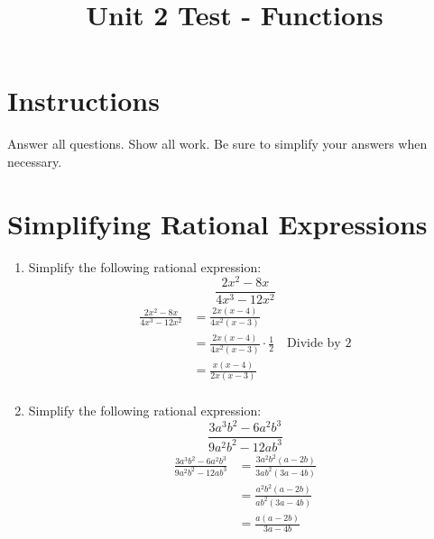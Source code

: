 \documentclass{article}
\title{Unit 2 Test - Functions}
\date{}
\begin{document}
\maketitle

\section*{Instructions}
Answer all questions. Show all work. Be sure to simplify your answers when necessary.

\section*{Simplifying Rational Expressions}
\begin{enumerate}
    \item Simplify the following rational expression:
    \begin{equation*}
        \frac{2x^2 - 8x}{4x^3 - 12x^2}
    \end{equation*}
    \begin{align*}
\frac{2x^2 - 8x}{4x^3 - 12x^2} &= \frac{2x(x - 4)}{4x^2(x - 3)} \\
&= \frac{2x(x - 4)}{4x^2(x - 3)} \cdot \frac{1}{2} \quad \text{Divide by 2} \\
&= \frac{x(x - 4)}{2x(x - 3)} \\
\end{align*}

    \item Simplify the following rational expression:
    \begin{equation*}
        \frac{3a^3b^2 - 6a^2b^3}{9a^2b^2 - 12ab^3}
    \end{equation*}
    \begin{align*}
\frac{3a^3b^2 - 6a^2b^3}{9a^2b^2 - 12ab^3} &= \frac{3a^2b^2(a - 2b)}{3ab^2(3a - 4b)} \\
&= \frac{a^2b^2(a - 2b)}{ab^2(3a - 4b)} \\
&= \frac{a(a - 2b)}{3a - 4b} \\
\end{align*}

\end{enumerate}
\end{document}
